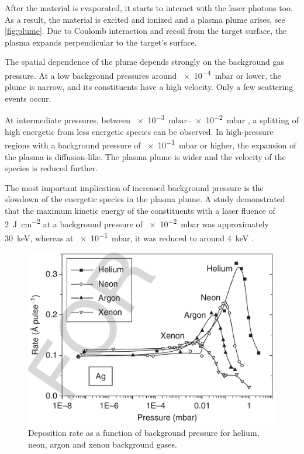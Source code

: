 After the material is evaporated, it starts to interact with the laser photons too.
As a result, the material is excited and ionized and a plasma plume arises, see 
\cref{fig:plume}.
Due to Coulomb interaction and recoil from the target surface, 
the plasma expands perpendicular to the target's surface.

The spatial dependence of the plume depends strongly on the background gas pressure.
At a low background pressures around \qty{e-4}{\milli \bar} or lower, the plume is
narrow, and its constituents have a high velocity.
Only a few scattering events occur.

At intermediate pressures, between \qtyrange{e-3}{e-2}{\milli \bar}
, a splitting of high energetic from less energetic species can be observed.
In high-pressure regions with a background pressure of \qty{e-1}{\milli \bar} or 
higher, the expansion of the plasma is diffusion-like.
The plasma plume is wider and the velocity of the species is
reduced further.

The most important implication of increased background pressure is the slowdown of 
the energetic species in the plasma plume. 
A study demonstrated that the maximum kinetic energy of the constituents
with a laser fluence of \qty{2}{\joule \per \centi \meter \squared} at a background 
pressure of \qty{e-2}{\milli \bar} was approximately \qty{30}{\kilo \electronvolt}, 
whereas at \qty{e-1}{\milli \bar}, it was reduced to around 
\qty{4}{\kilo \electronvolt} \cite{xu2014}.

\begin{figure}
	\centering
	\includegraphics[width=0.98\columnwidth]{../assets/deposition_rate.png}
	\caption{Deposition rate as a function of background pressure for helium, neon, 
	argon and xenon background gases. }
	\label{fig:pld_plasma}
\end{figure}

